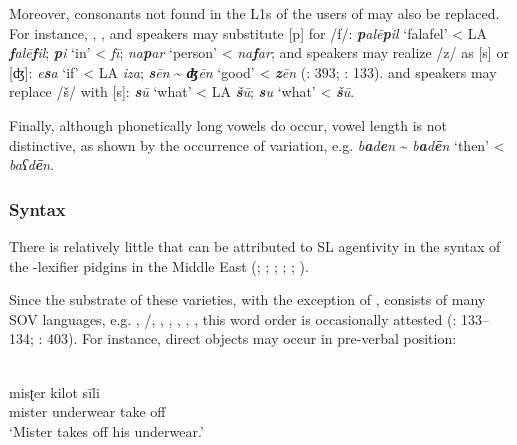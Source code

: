 \documentclass[output=paper]{langsci/langscibook}
\begin{document}
  Moreover, consonants not found in the L1s of the users of  may also be replaced. For instance, , ,  and  speakers may substitute [p] for /f/:  \textit{\textbf{p}alē\textbf{p}il} ‘falafel’ < LA \textit{\textbf{f}alē\textbf{f}il};   \textit{\textbf{p}i} ‘in’ <  \textit{fī};  \textit{na\textbf{p}ar} ‘person’ <  \textit{na\textbf{f}ar};  and  speakers may realize /z/ as [s] or [ʤ]:  \textit{e\textbf{s}a} ‘if’ < LA \textit{iza};  \textit{\textbf{s}ēn} {\textasciitilde} \textit{\textbf{ʤ}ēn} ‘good’ <  \textit{\textbf{z}ēn} (\citealt{Bizri2014}: 393; \citealt{Avram2017article}: 133).  and  speakers may replace /š/ with [s]:  \textit{\textbf{s}ū} ‘what’ < LA \textit{\textbf{š}ū};   \textit{\textbf{s}u} ‘what’ <  \textit{\textbf{š}ū}.

Finally, although phonetically long vowels do occur, {vowel length} is not distinctive, as shown by the occurrence of variation, e.g.  \textit{b\textbf{a}d\textbf{e}n} {\textasciitilde} \textit{b\textbf{a}d\textbf{ē}n} ‘then’ <  \textit{baʕd\textbf{ē}n}. 


 \subsubsection{Syntax} 

There is relatively little that can be attributed to {SL} agentivity in the syntax of the -{lexifier} pidgins in the Middle East (\citealt{Almoaily2013}; \citealt{Al-Salman2013}; \citealt{Avram2014Pidgin}; \citealt{Bizri2014}; \citealt{Avram2017article}; \citealt{Bakir2017}).

Since the {substrate} of these varieties, with the exception of  , consists of many SOV languages, e.g. , /, , , , , , this {word order} is occasionally attested (\citealt{Avram2017article}: 133–134; \citealt{Bizri2014}: 403). For instance, direct objects may occur in pre-verbal position:                                                              


\ea
\ea {} \citep[227]{Bizri2010}\\
\gll     misʈer kilot sīli\\
         mister underwear take off\\
\glt       `Mister takes off his underwear.'     
\end{document}

